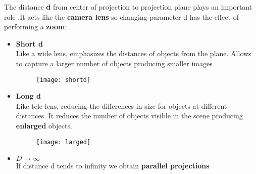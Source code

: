 The distance \textbf{d} from center of projection to projection plane plays an important role .It acts like the \textbf{camera lens}  so changing parameter d has the effect of performing a \textbf{zoom}:\\
\begin{itemize}
\item \textbf{Short d}\\
Like a wide lens, emphasizes the distances of objects from the plane.
Allows to capture a larger number of objects producing smaller images
\begin{figure}[H]
 \centering
  \texttt{[image: shortd]}
\end{figure}
\item \textbf{Long d}\\
Like tele-lens, reducing the differences in size for objects at different distances.
It reduces the number of objects visible in the scene producing \textbf{enlarged} objects.
\begin{figure}[H]
 \centering
  \texttt{[image: larged]}
\end{figure}
\item  $D \to \infty$\\
If distance d tends to infinity we obtain \textbf{parallel projections}
\end{itemize}